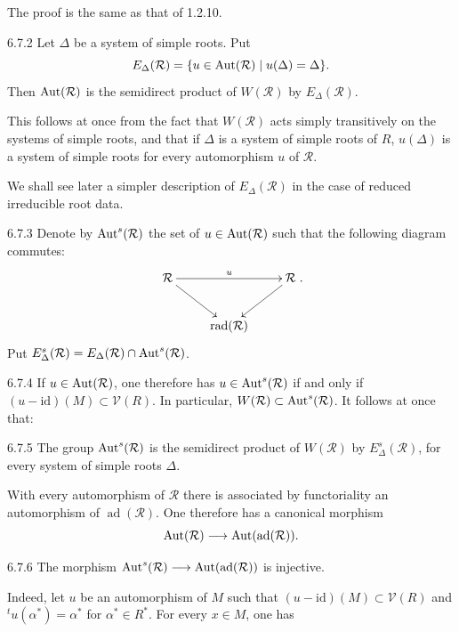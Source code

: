 The proof is the same as that of 1.2.10.
\begin{proposition}{6.7.2}\label{XXI.6.7.2}
Let $\Delta$ be a system of simple roots. Put
\[
E_\Delta(\mathcal R)=\{u\in\operatorname{Aut}(\mathcal R)\mid u(\Delta)=\Delta\}.
\]
Then $\operatorname{Aut}(\mathcal R)$ is the semidirect product of $W(\mathcal R)$ by $E_\Delta(\mathcal R)$.
\end{proposition}
This follows at once from the fact that $W(\mathcal R)$ acts simply transitively on the systems of simple roots, and that if $\Delta$ is a system of simple roots of $R$, $u(\Delta)$ is a system of simple roots for every automorphism $u$ of $\mathcal R$.

We shall see later a simpler description of $E_\Delta(\mathcal R)$ in the case of reduced irreducible root data.{\renewcommand{\thefootnote}{(27)}}
\begin{definition}{6.7.3}\label{XXI.6.7.3}
Denote by $\operatorname{Aut}^s(\mathcal R)${\renewcommand{\thefootnote}{(28)}} the set of $u\in\operatorname{Aut}(\mathcal R)$ such that the following diagram commutes:
\[
\xymatrix{\mathcal R\ar[rr]^u\ar[dr]&&\mathcal R\ar[dl]\\
&\operatorname{rad}(\mathcal R)&}.
\]
Put $E_\Delta^s(\mathcal R)=E_\Delta(\mathcal R)\cap\operatorname{Aut}^s(\mathcal R)$.
\end{definition}
\begin{remark}{6.7.4}\label{XXI.6.7.4}
If $u\in\operatorname{Aut}(\mathcal R)$, one therefore has $u\in\operatorname{Aut}^s(\mathcal R)$ if and only if $(u-\mathrm{id})(M)\subset\mathcal V(R)$. In particular, $W(\mathcal R)\subset\operatorname{Aut}^s(\mathcal R)$. It follows at once that:
\end{remark}
\begin{proposition}{6.7.5}\label{XXI.6.7.5}
The group $\operatorname{Aut}^s(\mathcal R)$ is the semidirect product of $W(\mathcal R)$ by $E_\Delta^s(\mathcal R)$, for every system of simple roots $\Delta$.
\end{proposition}
With every automorphism of $\mathcal R$ there is associated by functoriality an automorphism of $\operatorname{ad}(\mathcal R)$. One therefore has a canonical morphism
\[
\operatorname{Aut}(\mathcal R)\longrightarrow\operatorname{Aut}(\operatorname{ad}(\mathcal R)).
\]
\begin{lemma}{6.7.6}\label{XXI.6.7.6}
The morphism $\operatorname{Aut}^s(\mathcal R)\longrightarrow\operatorname{Aut}(\operatorname{ad}(\mathcal R))$ is injective.
\end{lemma}
Indeed, let $u$ be an automorphism of $M$ such that $(u-\mathrm{id})(M)\subset\mathcal V(R)$ and ${}^tu(\alpha^*)=\alpha^*$ for $\alpha^*\in R^*$. For every $x\in M$, one has

